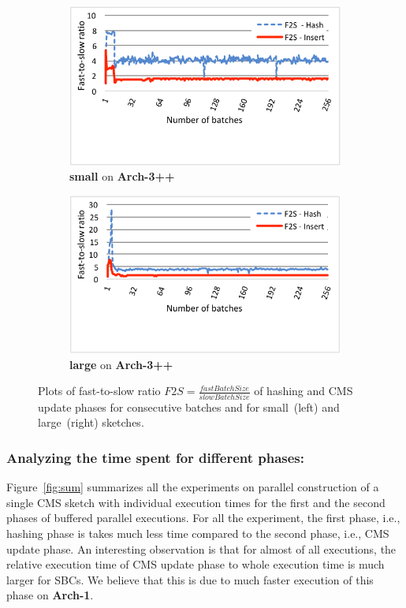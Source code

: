 \documentclass[10pt, review=true,sigconf]{acmart}
\begin{document}
\begin{figure}[htbp]
	\begin{subfigure}[t]{0.45\textwidth}
		\includegraphics[width=\linewidth]{expfigs/f2s-small.pdf}
		\caption{{\bf small} on {\bf Arch-3++}}
		\label{fig:fs-small}
	\end{subfigure}\hspace*{4ex}
	\begin{subfigure}[t]{0.45\textwidth}
		\includegraphics[width=\linewidth]{expfigs/f2s-big.pdf}
		\caption{{\bf large} on {\bf Arch-3++}}
		\label{fig:fs-large}
	\end{subfigure}
	
	\caption{Plots of fast-to-slow ratio $F2S = \frac{fastBatchSize}{slowBatchSize}$ of hashing and CMS update phases for consecutive batches and for small~(left) and large~(right) sketches.}
	\label{fig:load}
\end{figure}

\subsubsection{Analyzing the time spent for different phases:} Figure~\ref{fig:sum} summarizes all the experiments on parallel construction of a single CMS sketch with individual execution times for the first and the second phases of buffered parallel executions. For all the experiment, the first phase, i.e., hashing phase is takes much less time compared to the second phase, i.e., CMS update phase. An interesting observation is that for almost of all executions, the relative execution time of CMS update phase to whole execution time is much larger for SBCs. We believe that this is due to much faster execution of this phase on \textbf{Arch-1}.
\end{document}
